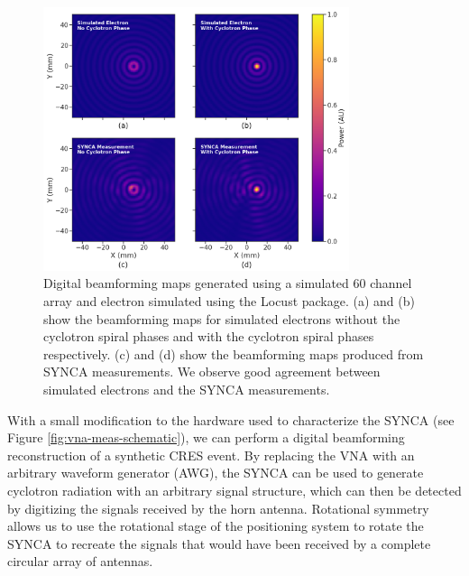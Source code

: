 \begin{figure}[h]
    \centering
    \includegraphics[width=0.8\textwidth]{figs/Chapter-5/220812_10mm_beamforming_compare.png}
    \caption{\label{fig:bf} Digital beamforming maps generated using a simulated 60 channel array and electron simulated using the Locust package. (a) and (b) show the beamforming maps for simulated electrons without the cyclotron spiral phases and with the cyclotron spiral phases respectively. (c) and (d) show the beamforming maps produced from SYNCA measurements. We observe good agreement between simulated electrons and the SYNCA measurements.}
    \qquad
\end{figure}

With a small modification to the hardware used to characterize the SYNCA (see Figure \ref{fig:vna-meas-schematic}), we can perform a digital beamforming reconstruction of a synthetic CRES event. By replacing the VNA with an arbitrary waveform generator (AWG), the SYNCA can be used to generate cyclotron radiation with an arbitrary signal structure, which can then be detected by digitizing the signals received by the horn antenna. Rotational symmetry allows us to use the rotational stage of the positioning system to rotate the SYNCA to recreate the signals that would have been received by a complete circular array of antennas. 

